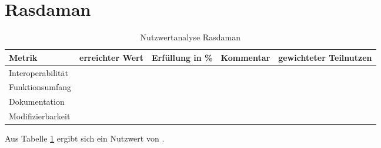 

\section{Rasdaman}
\begin{table}[htp]
\centering
\small
\begin{tabular}{l|p{1.8cm}|c|p{3cm}|p{1.8cm}}
\textbf{Metrik} & \textbf{erreichter Wert} & \textbf{Erfüllung in \%} & \textbf{Kommentar} & \textbf{gewichteter Teilnutzen} \\ \hline
Interoperabilität &  &  &  &  \\ \hline
Funktionsumfang &  &  &  &  \\ \hline
Dokumentation &  &  &  &  \\ \hline
Modifizierbarkeit &  &  &  &  \\
\end{tabular}
\caption{Nutzwertanalyse Rasdaman}
\label{table:nutzwertanalyse-rasdaman}
\end{table}
Aus Tabelle \ref{table:nutzwertanalyse-rasdaman} ergibt sich ein Nutzwert von .


